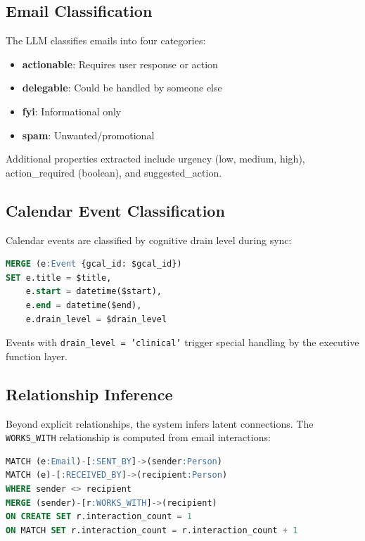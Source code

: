 \documentclass[11pt,a4paper]{article}
\begin{document}
\subsection{Email Classification}

The LLM classifies emails into four categories:
\begin{itemize}
    \item \textbf{actionable}: Requires user response or action
    \item \textbf{delegable}: Could be handled by someone else
    \item \textbf{fyi}: Informational only
    \item \textbf{spam}: Unwanted/promotional
\end{itemize}

Additional properties extracted include urgency (low, medium, high), action\_required (boolean), and suggested\_action.

\subsection{Calendar Event Classification}

Calendar events are classified by cognitive drain level during sync:

\begin{lstlisting}[language=SQL]
MERGE (e:Event {gcal_id: $gcal_id})
SET e.title = $title,
    e.start = datetime($start),
    e.end = datetime($end),
    e.drain_level = $drain_level
\end{lstlisting}

Events with \texttt{drain\_level = 'clinical'} trigger special handling by the executive function layer.

\subsection{Relationship Inference}

Beyond explicit relationships, the system infers latent connections. The \texttt{WORKS\_WITH} relationship is computed from email interactions:

\begin{lstlisting}[language=SQL]
MATCH (e:Email)-[:SENT_BY]->(sender:Person)
MATCH (e)-[:RECEIVED_BY]->(recipient:Person)
WHERE sender <> recipient
MERGE (sender)-[r:WORKS_WITH]->(recipient)
ON CREATE SET r.interaction_count = 1
ON MATCH SET r.interaction_count = r.interaction_count + 1
\end{lstlisting}
\end{document}
